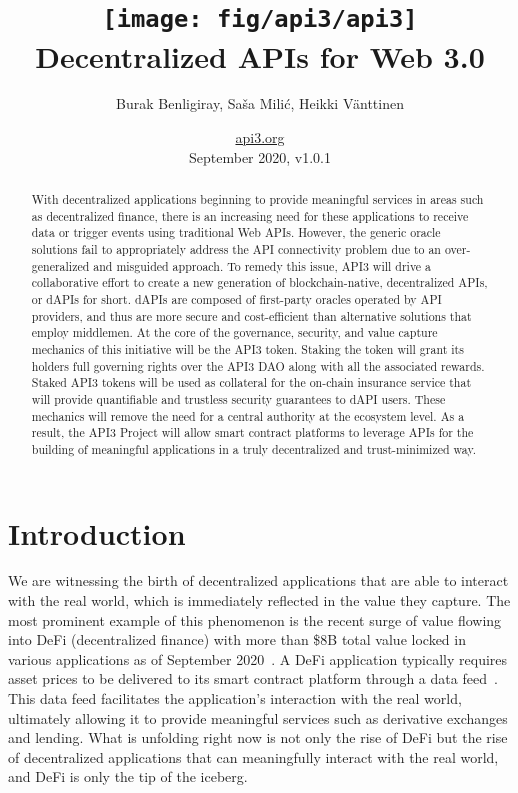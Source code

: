 \documentclass[11pt]{article}
\title{\texttt{[image: fig/api3/api3]} \\ Decentralized APIs for Web 3.0}
\author{Burak Benligiray, Sa\v{s}a Mili\'{c}, Heikki Vänttinen}
\date{\href{https://api3.org}{api3.org} \\ \medskip September 2020, v1.0.1}
\begin{document}

\maketitle

\begin{abstract}
\noindent 
With decentralized applications beginning to provide meaningful services in areas such as decentralized finance, there is an increasing need for these applications to receive data or trigger events using traditional Web APIs.
However, the generic oracle solutions fail to appropriately address the API connectivity problem due to an over-generalized and misguided approach.
To remedy this issue, API3 will drive a collaborative effort to create a new generation of blockchain-native, decentralized APIs, or dAPIs for short.
dAPIs are composed of first-party oracles operated by API providers, and thus are more secure and cost-efficient than alternative solutions that employ middlemen.
At the core of the governance, security, and value capture mechanics of this initiative will be the API3 token.
Staking the token will grant its holders full governing rights over the API3 DAO along with all the associated rewards.
Staked API3 tokens will be used as collateral for the on-chain insurance service that will provide quantifiable and trustless security guarantees to dAPI users.
These mechanics will remove the need for a central authority at the ecosystem level.
As a result, the API3 Project will allow smart contract platforms to leverage APIs for the building of meaningful applications in a truly decentralized and trust-minimized way.
\end{abstract}

\newpage
{}
\setcounter{page}{2}
\renewcommand{\contentsname}{} %
\tableofcontents


\newpage
{}
\setcounter{page}{1}

\section{Introduction}
\label{sec:introduction}

We are witnessing the birth of decentralized applications that are able to interact with the real world, which is immediately reflected in the value they capture.
The most prominent example of this phenomenon is the recent surge of value flowing into DeFi (decentralized finance) with more than \$8B total value locked in various applications as of September 2020~\cite{defipulse}.
A DeFi application typically requires asset prices to be delivered to its smart contract platform through a data feed~\cite{liu:2020}.
This data feed facilitates the application’s interaction with the real world, ultimately allowing it to provide meaningful services such as derivative exchanges and lending.
What is unfolding right now is not only the rise of DeFi but the rise of decentralized applications that can meaningfully interact with the real world, and DeFi is only the tip of the iceberg.
\end{document}
